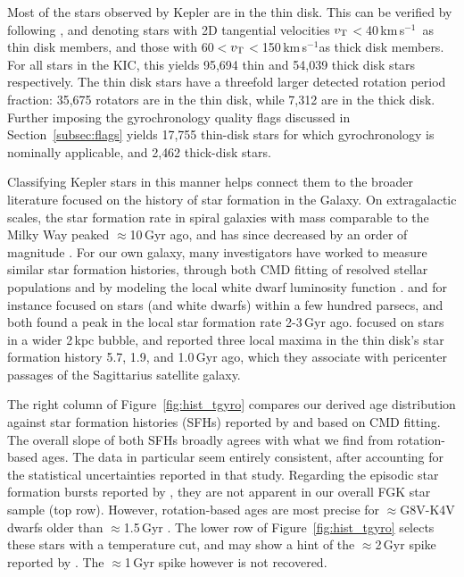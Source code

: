 \documentclass[11pt,twocolumn,tighten]{aastex63}
\newcommand{\kms}{{km\,s$^{-1}$}}
\begin{document}
Most of the stars observed by Kepler are in the thin disk.  This can
be verified by following \citet{Gaia_2018}, and denoting stars with 2D
tangential velocities $v_{\rm T}$$<$40\,\kms\ as thin disk members,
and those with 60$<$$v_{\rm T}$$<$150\,\kms as thick disk members.
For all stars in the KIC, this yields 95{,}694 thin and 54{,}039 thick
disk stars respectively.  The thin disk stars have a threefold larger
detected rotation period fraction: 35{,}675 rotators are in the thin
disk, while 7{,}312 are in the thick disk.  Further imposing the
gyrochronology quality flags discussed in Section~\ref{subsec:flags}
yields 17{,}755 thin-disk stars for which gyrochronology is nominally
applicable, and 2{,}462 thick-disk stars.

Classifying Kepler stars in this manner helps connect them to the
broader literature focused on the history of star formation in the
Galaxy.  On extragalactic scales, the star formation rate in spiral
galaxies with mass comparable to the Milky Way peaked $\approx$10\,Gyr
ago, and has since decreased by an order of magnitude
\citep[e.g.][]{2004Natur.428..625H,2006ApJ...651..142H}.  For our own
galaxy, many investigators have worked to measure similar star
formation histories, through both CMD fitting of resolved stellar
populations
\citep[][]{2019A&A...624L...1M,2020NatAs...4..965R,2021MNRAS.501..302A,2022Natur.603..599X}
and by modeling the local white dwarf luminosity function
\citep[e.g.][]{2019ApJ...878L..11I}.  \citet{2019A&A...624L...1M} and
\citet{2019ApJ...878L..11I} for instance focused on stars (and white
dwarfs) within a few hundred parsecs, and both found a peak in the
local star formation rate 2-3\,Gyr ago.  \citet{2020NatAs...4..965R}
focused on stars in a wider 2\,kpc bubble, and reported three local
maxima in the thin disk's star formation history 5.7, 1.9, and
1.0\,Gyr ago, which they associate with pericenter passages of the
Sagittarius satellite galaxy.

The right column of Figure~\ref{fig:hist_tgyro} compares our derived
age distribution against star formation histories (SFHs) reported by
\citet{2019A&A...624L...1M} and \citet{2020NatAs...4..965R} based on
CMD fitting.  The overall slope of both SFHs broadly agrees with what
we find from rotation-based ages.  The \citet{2019A&A...624L...1M}
data in particular seem entirely consistent, after accounting for the
statistical uncertainties reported in that study.  Regarding the
episodic star formation bursts reported by
\citet{2020NatAs...4..965R}, they are not apparent in our overall FGK
star sample (top row).  However, rotation-based ages are most precise
for $\approx$G8V-K4V dwarfs older than $\approx$1.5\,Gyr
\citep{Bouma_2023}.  The lower row of Figure~\ref{fig:hist_tgyro}
selects these stars with a temperature cut, and may show a hint of the
$\approx$2\,Gyr spike reported by \citet{2020NatAs...4..965R}.  The
$\approx$1\,Gyr spike however is not recovered.
\end{document}
